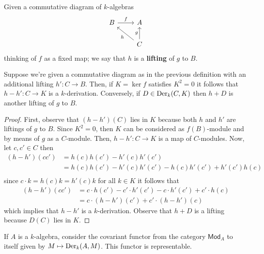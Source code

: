 \begin{definition}\label{def:lifting}
Given a commutative diagram of $k$-algebras
\[
	\begin{tikzcd}
		 	B \arrow[r, "f"] & A \\
		 	& C\arrow[lu, "h"] \arrow[u, "g"]
	\end{tikzcd} 
\]
thinking of $f$ as a fixed map; we say that $h$ is a \textbf{lifting} of $g$ to $B$. 
\end{definition}
\begin{lemma}\label{lemm:two-liftings}
	Suppose we're given a commutative diagram as in the previous definition with an additional lifting $h'\colon C \to B$. Then, if $K = \ker f$ satisfies $K^{2} = 0$ it follows that $h - h'\colon C \to K$ is a $k$-derivation. Conversely, if $D \in \operatorname{Der}_{k}(C, K)$ then $h + D$ is another lifting of $g$ to $B$.
\end{lemma}
\begin{proof}
	First, observe that $(h - h')(C)$ lies in $K$ because both $h$ and $h'$ are liftings of $g$ to $B$. Since $K^{2} = 0$, then $K$ can be considered as $f(B)$-module and by means of $g$ as a $C$-module. Then, $h-h'\colon C \to K$ is a map of $C$-modules. Now, let $c,c' \in C$ then
	\begin{align*}
	(h -h')(cc') &= h(c)h(c') - h'(c)h'(c') \\
	&= h(c)h(c') - h'(c)h'(c') - h(c)h'(c') + h'(c')h(c) \\
	\end{align*}
	since $c \cdot k = h(c)k = h'(c)k$ for all $k \in K$ it follows that
	\begin{align*}
		(h -h')(cc') &= c\cdot h(c') - c'\cdot h'(c') - c\cdot h'(c') + c'\cdot h(c) \\
		&= c\cdot (h - h')(c') + c'\cdot (h - h')(c)
	\end{align*}
	which implies that $h - h'$ is a $k$-derivation. Observe that $h + D$ is a lifting because $D(C)$ lies in $K$.
\end{proof}
\begin{theorem}\label{prop:differentials-representable-functor}
	If $A$ is a $k$-algebra, consider the covariant functor from the category $\mathsf{Mod}_{A}$ to itself given by $M \mapsto \operatorname{Der}_{k}(A,M)$. This functor is representable. 
\end{theorem}
